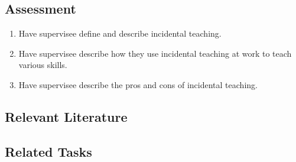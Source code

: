 \subsection{Assessment}
\begin{enumerate}
\item Have supervisee define and describe incidental teaching.
\item Have supervisee describe how they use incidental teaching at work to teach various skills.
\item Have supervisee describe the pros and cons of incidental teaching.
%
\end{enumerate}
%
\subsection{Relevant Literature}
\begin{refsection}
\nocite{test,alang2017police,clayton2018black}
\printbibliography[heading=none]
\end{refsection}
%
\subsection{Related Tasks}
\fourbThree{}\\ 
\fourdFour{}\\
\fourdFive{}\\
\fourdEleven{}\\
\fourjSix{}\\
\fourjEleven{}\\
\fourFKFourtyFour{}\\
%
%
%
%
%
%
